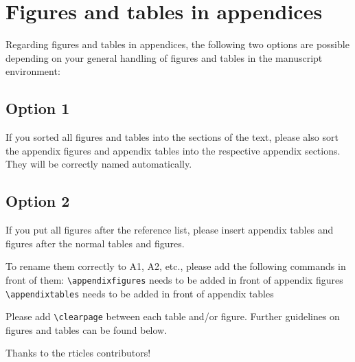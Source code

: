 \documentclass[gc, manuscript, english]{copernicus}
\begin{document}

\appendix
\section{Figures and tables in appendices}

Regarding figures and tables in appendices, the following two options
are possible depending on your general handling of figures and tables in
the manuscript environment:

\subsection{Option 1}

If you sorted all figures and tables into the sections of the text,
please also sort the appendix figures and appendix tables into the
respective appendix sections. They will be correctly named
automatically.

\subsection{Option 2}

If you put all figures after the reference list, please insert appendix
tables and figures after the normal tables and figures.

To rename them correctly to A1, A2, etc., please add the following
commands in front of them: \texttt{\textbackslash{}appendixfigures}
needs to be added in front of appendix figures
\texttt{\textbackslash{}appendixtables} needs to be added in front of
appendix tables

Please add \texttt{\textbackslash{}clearpage} between each table and/or
figure. Further guidelines on figures and tables can be found below.
\noappendix




\begin{acknowledgements}
Thanks to the rticles contributors!
\end{acknowledgements}
\end{document}
